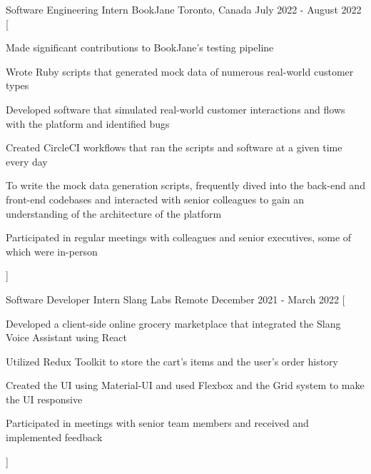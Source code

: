 

\begin{cventries}

  \cventry
    {Software Engineering Intern} %
    {BookJane} %
    {Toronto, Canada} %
    {July 2022 - August 2022} %
    [
      \begin{cvitems} %
        \item {Made significant contributions to BookJane's testing pipeline}
        \item {Wrote Ruby scripts that generated mock data of numerous real-world customer types}
        \item {Developed software that simulated real-world customer interactions and flows with the platform and identified bugs}
        \item {Created CircleCI workflows that ran the scripts and software at a given time every day}
        \item {To write the mock data generation scripts, frequently dived into the back-end and front-end codebases and interacted with senior colleagues to gain an understanding of the architecture of the platform}
        \item {Participated in regular meetings with colleagues and senior executives, some of which were in-person}
      \end{cvitems}
    ]

  \cventry
    {Software Developer Intern} %
    {Slang Labs} %
    {Remote} %
    {December 2021 - March 2022} %
    [
      \begin{cvitems} %
        \item {Developed a client-side online grocery marketplace that integrated the Slang Voice Assistant using React}
        \item {Utilized Redux Toolkit to store the cart's items and the user's order history}
        \item {Created the UI using Material-UI and used Flexbox and the Grid system to make the UI responsive}
        \item {Participated in meetings with senior team members and received and implemented feedback}
      \end{cvitems}
    ]


\end{cventries}
